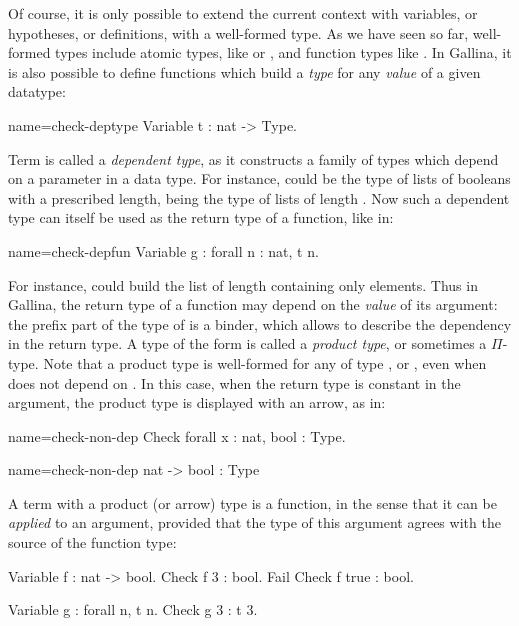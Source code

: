 Of course, it is only possible to extend the current context with variables, or
hypotheses, or definitions, with a well-formed type. As we have seen
so far, well-formed types include atomic types, like  or
, and function types like . In Gallina, it is
also possible to define functions which build a \emph{type} for any
\emph{value} of a given datatype:
\begin{coq}{name=check-deptype}{}
Variable t : nat -> Type.
\end{coq}

Term  is called a \emph{dependent type}, as it constructs a
family of types which depend on a parameter in a data type. For
instance,  could be the type of lists of booleans with a
prescribed length,  being the type of lists of length
. Now such a dependent type can itself be used as the return type
of a function, like in: 

\begin{coq}{name=check-depfun}{}
Variable g : forall n : nat, t n.
\end{coq}

For instance,  could build the list of length  containing
only  elements.
Thus in Gallina, the return type of a function may depend on the
\emph{value} of its argument: the prefix  part of the
type of  is a binder, which allows to describe the dependency in
the return type. A type of the form  is called a
\emph{product type}, or sometimes a $\Pi$-type. Note that a product
type  is well-formed for any  of type ,
 or , even when  does not depend on . In this
case, when the return type is constant in the argument, the product
type is displayed with an arrow, as in:

\begin{coq-left}{name=check-non-dep}{}
Check forall x : nat, bool : Type.
\end{coq-left}
\begin{coqout-right}{name=check-non-dep}{}
nat -> bool : Type
\end{coqout-right}
  
A term with a product (or arrow) type is a function, in the sense that
it can be \emph{applied} to an argument, provided that the type of
this argument agrees with the source of the function type:

\begin{coq}{}{}
Variable f : nat -> bool.
Check f 3 : bool.
Fail Check f true : bool.

Variable g : forall n, t n.
Check g 3 : t 3.
\end{coq}

